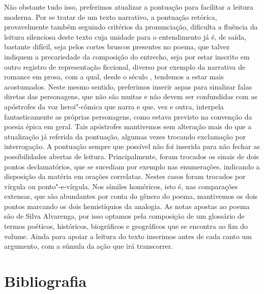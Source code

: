 Não obstante tudo isso, preferimos atualizar a pontuação para facilitar a leitura moderna.
Por se tratar de um texto narrativo, a pontuação retórica, provavelmente também
seguindo critérios da pronunciação, dificulta a fluência da leitura silenciosa
deste texto cuja unidade para o entendimento já é, de saída, bastante difícil, seja pelos cortes bruscos presentes no poema, que talvez indiquem a precariedade da composição do entrecho, 
seja por estar inscrito em outro registro de representação ficcional, diverso por exemplo
da narrativa de romance em prosa, com a qual, desde o século , tendemos a estar mais
acostumados.
Neste mesmo sentido, preferimos inserir aspas para sinalizar falas diretas das personagens,
que não são muitas e não devem ser confundidas com as apóstrofes da voz heroi"-cômica que
narra e que, vez e outra, interpela fantasticamente as próprias personagens, como estava
previsto na convenção da poesia épica em geral.
Tais apóstrofes mantivemos sem alteração mais do que a atualização já referida da
pontuação, algumas vezes trocando exclamação por interrogação.
A pontuação sempre que possível não foi inserida para não fechar as possibilidades
abertas de leitura. Principalmente, foram trocados os sinais de dois pontos declamatórios,
que se sucediam por exemplo nas enumerações, indicando a disposição da matéria em orações
correlatas. Nestes casos foram trocados por vírgula ou ponto"-e-vírgula. Nos símiles homéricos,
isto é, nas comparações extensas, que são abundantes por conta do gênero do poema,
mantivemos os dois pontos marcando os dois hemistíquios da analogia. As notas apostas ao poema são de Silva Alvarenga, por isso optamos pela composição de um glossário de termos poéticos, históricos, biográficos e geográficos que se encontra ao fim do volume. Ainda para apoiar a leitura do texto inserimos antes de cada canto um argumento, com a súmula da ação que irá transcorrer.



\section*{Bibliografia}

